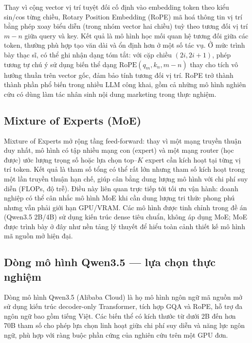 Thay vì cộng vector vị trí tuyệt đối cố định vào embedding token theo
kiểu sin/cos từng chiều, Rotary Position Embedding (RoPE)
 mã
hoá thông tin vị trí bằng phép xoay biểu diễn (trong nhóm
vector hai chiều) tuỳ theo tương đối vị trí $m-n$ giữa query và key.
Kết quả là mô hình học mối quan hệ tương đối giữa các token, thường
phù hợp tạo văn dài và ổn định hơn ở một số tác vụ. Ở mức trình bày
thạc sĩ, có thể ghi nhận dạng tóm tắt: với cặp chiều $(2i, 2i+1)$,
phép tương tự chú ý sử dụng biến thể dạng
$\mathrm{RoPE}(q_m, k_n, m-n)$ thay cho tích vô hướng thuần trên
vector gốc, đảm bảo tính tương đối vị trí. RoPE trở thành thành phần
phổ biến trong nhiều LLM công khai, gồm cả những mô hình nghiên cứu
có dùng làm tác nhân sinh nội dung marketing trong thực nghiệm.

\subsection{Mixture of Experts (MoE)}

Mixture of Experts mở rộng tầng feed-forward: thay vì một mạng
truyền thuận duy nhất, mô hình có tập nhiều mạng con
(expert) và một mạng router (học được) ước lượng
trọng số hoặc lựa chọn top--$K$ expert cần kích hoạt tại từng vị trí
token. Kết quả là tham số tổng có thể rất lớn nhưng
tham số kích hoạt trong một lần truyền thuận hạn chế, giúp
cân bằng dung lượng mô hình với chi phí suy diễn (FLOPs, độ
trễ). Điều này liên quan trực tiếp tới tối ưu vận hành: doanh
nghiệp có thể cân nhắc mô hình MoE khi cần dung lượng tri thức
phong phú nhưng vẫn phải giới hạn GPU/VRAM. Các mô hình được tinh chỉnh
trong đề án (Qwen3.5 2B/4B) sử dụng kiến trúc dense tiêu chuẩn, không
áp dụng MoE; MoE được trình bày ở đây như nền tảng lý thuyết để hiểu toàn
cảnh thiết kế mô hình mã nguồn mở hiện đại.

\subsection{Dòng mô hình Qwen3.5 --- lựa chọn thực nghiệm}\label{subsec:qwen}

Dòng mô hình Qwen3.5 (Alibaba Cloud)  là họ mô hình ngôn ngữ mã nguồn
mở sử dụng kiến trúc decoder-only Transformer, tích hợp GQA và RoPE,
hỗ trợ đa ngôn ngữ bao gồm tiếng Việt. Các biến thể có kích thước từ
dưới 2B đến hơn 70B tham số cho phép lựa chọn linh hoạt giữa chi phí
suy diễn và năng lực ngôn ngữ, phù hợp với ràng buộc phần cứng của
nghiên cứu trên một GPU đơn.

